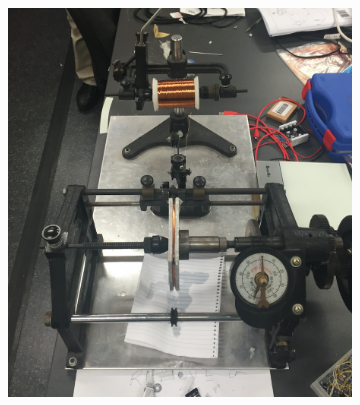 \begin{enumerate}
\begin{center}
\begin{figure}[H]
\begin{subfigure}{0.5\textwidth}
                \includegraphics[scale = 0.35]{./figures/Construction_2}
            \end{subfigure}
        \end{figure}
    \end{center}
    \vspace{-5mm}
    

\end{enumerate}
